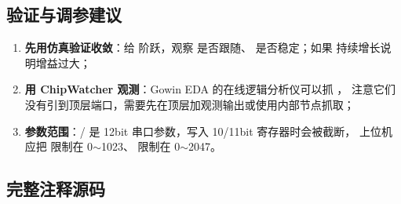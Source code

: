 \subsection{验证与调参建议}

\begin{enumerate}[leftmargin=2em,itemsep=2pt]
  \item \textbf{先用仿真验证收敛}：给  阶跃，观察  是否跟随、
         是否稳定；如果  持续增长说明增益过大；
  \item \textbf{用 ChipWatcher 观测}：Gowin EDA 的在线逻辑分析仪可以抓 ，
        注意它们没有引到顶层端口，需要先在顶层加观测输出或使用内部节点抓取；
  \item \textbf{参数范围}：/ 是 12bit 串口参数，写入 10/11bit 寄存器时会被截断，
        上位机应把  限制在 0$\sim$1023、 限制在 0$\sim$2047。
\end{enumerate}

\subsection{完整注释源码}


